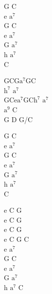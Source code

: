 \begin{chord}
    G C\\
    e $\mathrm{a^7}$\\
    G C\\
    e $\mathrm{a^7}$\\
    G $\mathrm{a^7}$\\
    h $\mathrm{a^7}$\\
    C

    GCG$\mathrm{a^{7}}$GC\\
    $\mathrm{h^7}$ $\mathrm{a^7}$\\
    GCe$\mathrm{a^{7}}$GC$\mathrm{h^{7}}$ $\mathrm{a^{7}}$\\
    $\mathrm{a^9}$ C\\
    G D G/C

    G C\\
    e $\mathrm{a^7}$\\
    G C\\
    e $\mathrm{a^7}$\\
    G $\mathrm{a^7}$\\
    h $\mathrm{a^7}$\\
    C

    e C G\\
    e C G\\
    e C G\\
    e C
    G C\\
    e $\mathrm{a^7}$\\
    G C\\
    e $\mathrm{a^7}$\\
    G $\mathrm{a^7}$\\
    h $\mathrm{a^7}$ C
\end{chord}
